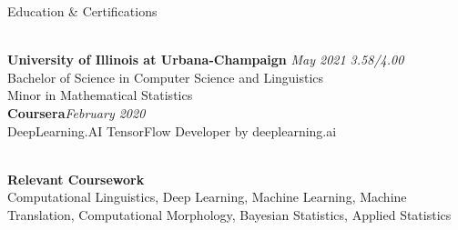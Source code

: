 \documentclass[10pt]{resume} %
\begin{document}

\begin{rSection}{Education & Certifications}

\\{\bf  University of Illinois at Urbana-Champaign} \hfill {\em May 2021 3.58/4.00} 
\\ Bachelor of Science in Computer Science and Linguistics    
\\ Minor in Mathematical Statistics
\\{\bf Coursera}\hfill {\em February 2020} 
\\ DeepLearning.AI TensorFlow Developer by deeplearning.ai 

\\{\bf Relevant Coursework}
\\ Computational Linguistics, Deep Learning, Machine Learning, Machine Translation, Computational Morphology, Bayesian Statistics, Applied Statistics
\end{rSection}


\end{document}
